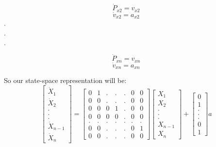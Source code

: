 \documentclass[10pt,letterpaper]{article}
\begin{document}
\begin{equation}
\dot{P}_{x2}= v_{x2}
\end{equation}
\begin{equation}
\dot{v}_{x2} = a_{x2}
\end{equation}
\centering
.\\
.\\
.

\begin{equation}
\dot{P}_{xn}= v_{xn}
\end{equation}
\begin{equation}
\dot{v}_{xn} = a_{xn}
\end{equation}

\begin{flushleft}
So our state-space representation will be:
\begin{equation}
\begin{bmatrix}
\dot{X}_1\\ 
\dot{X}_2\\
.\\
.\\
.\\
\dot{X}_{n-1}\\
\dot{X}_n

\end{bmatrix} = \begin{bmatrix}
0 & 1 & . & . & . & 0 & 0 \\
0 & 0 & . & . & . & 0 & 0 \\
0 & 0 & 0 & 1 & . & 0 & 0 \\
0 & 0 & 0 & 0 & . & 0 & 0 \\
. & . & . & . & . & . & . \\
0 & 0 & . & . & . & 0 & 1 \\
0 & 0 & . & . & . & 0 & 0 
\end{bmatrix}  \begin{bmatrix}
X_1\\
X_2\\
.\\
.\\
.\\
X_{n-1}\\
X_n
\end{bmatrix} + \begin{bmatrix}
0\\
1\\
.\\
.\\
.\\
0\\
1
\end{bmatrix} a
\end{equation}


\end{flushleft}
\end{document}
